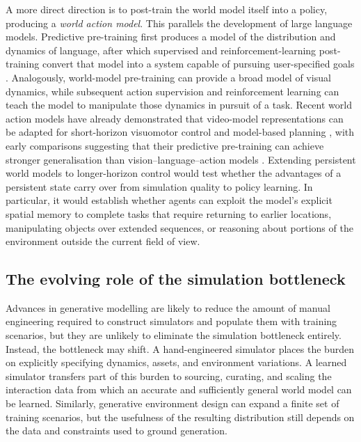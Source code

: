 A more direct direction is to post-train the world model itself into a policy, producing a \emph{world action model}. This parallels the development of large language models. Predictive pre-training first produces a model of the distribution and dynamics of language, after which supervised and reinforcement-learning post-training convert that model into a system capable of pursuing user-specified goals \citep{ouyang2022training}. Analogously, world-model pre-training can provide a broad model of visual dynamics, while subsequent action supervision and reinforcement learning can teach the model to manipulate those dynamics in pursuit of a task. Recent world action models have already demonstrated that video-model representations can be adapted for short-horizon visuomotor control and model-based planning \citep{kim2026cosmos}, with early comparisons suggesting that their predictive pre-training can achieve stronger generalisation than vision--language--action models \citep{wang2026world}. %
Extending persistent world models to longer-horizon control would test whether the advantages of a persistent state carry over from simulation quality to policy learning. In particular, it would establish whether agents can exploit the model's explicit spatial memory to complete tasks that require returning to earlier locations, manipulating objects over extended sequences, or reasoning about portions of the environment outside the current field of view.

\subsection{The evolving role of the simulation bottleneck}

Advances in generative modelling are likely to reduce the amount of manual engineering required to construct simulators and populate them with training scenarios, but they are unlikely to eliminate the simulation bottleneck entirely. Instead, the bottleneck may shift. A hand-engineered simulator places the burden on explicitly specifying dynamics, assets, and environment variations. A learned simulator transfers part of this burden to sourcing, curating, and scaling the interaction data from which an accurate and sufficiently general world model can be learned. Similarly, generative environment design can expand a finite set of training scenarios, but the usefulness of the resulting distribution still depends on the data and constraints used to ground generation.

